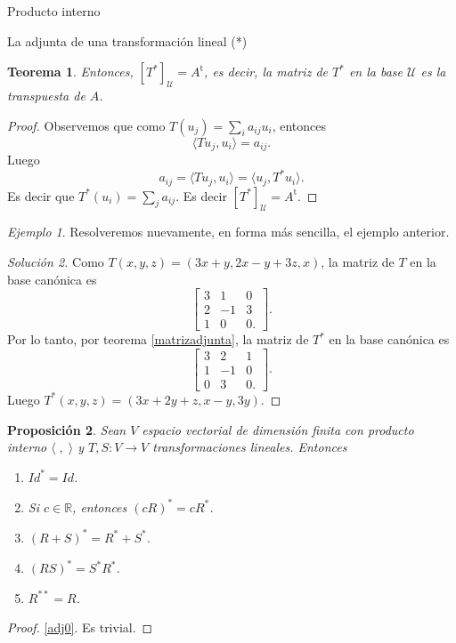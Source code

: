 \documentclass[a4paper,12pt,twoside,spanish,reqno]{amsbook}
\numberwithin{equation}{section}
\newtheorem{teorema}{Teorema}[section]
\newtheorem{proposicion}[teorema]{Proposici\'on}
\theoremstyle{definition}
\theoremstyle{remark}
\newtheorem*{ejemplo*}{Ejemplo}
\newcommand{\la}{\langle}
\newcommand{\ra}{\rangle}
\renewcommand{\t}{{\operatorname{t}}}
\newcommand{\R}{\mathbb R}
\begin{document}
\begin{chapter}{Producto interno}
\begin{section}{La adjunta de una transformación lineal (*)}
\begin{teorema}
            Entonces, $[T^*]_{\mathcal U} = A^\t$, es decir, la matriz de $T^*$ en la base $\mathcal U$ es la transpuesta de $A$. 
        \end{teorema}
        \begin{proof}
            Observemos  que como $T(u_j) = \sum_i a_{ij}u_i$, entonces 
            $$
            \la Tu_j,u_i\ra = a_{ij}.
            $$
            Luego 
            $$
            a_{ij} = \la Tu_j,u_i\ra = \la u_j,T^*u_i\ra.
            $$
            Es decir  que $T^*(u_i) = \sum_j a_{ij}$. Es decir $[T^*]_{\mathcal U} = A^\t$.
        \end{proof}
        
        
    
        
        \begin{ejemplo*} Resolveremos nuevamente, en forma más sencilla, el ejemplo anterior.
        \end{ejemplo*}
        \begin{proof}[Solución 2]
            Como $T(x,y,z) = (3x +y, 2x -y+ 3z, x)$, la matriz de $T$ en la base canónica es 
            $$
            \left[\begin{matrix}
            3&1&0\\2&-1&3\\1&0&0.
            \end{matrix}
            \right].
            $$
            Por lo tanto, por teorema  \ref{matrizadjunta}, la matriz de $T^*$ en la base canónica es
            $$
            \left[\begin{matrix}
            3&2&1\\1&-1&0\\0&3&0.
            \end{matrix}
            \right].
            $$
            Luego $T^*(x,y,z) = (3x+2y+z,x-y,3y)$.
        \end{proof}

    
        
        \begin{proposicion}\label{adjprop}
            Sean $V$ espacio vectorial de dimensión finita con producto interno $\la \;,\;\ra$ y $T,S:V \to V$ transformaciones lineales. Entonces
            \begin{enumerate}
                \item\label{adj0} $Id^* = Id$.
                \item\label{adj1} Si $c \in \R$, entonces $(cR)^* = cR^*$.
                \item\label{adj2} $(R+S)^* = R^* + S^*$.
                \item\label{adj3} $(RS)^* = S^*R^*$.
                \item\label{adj4} $R^{**} = R$.
            \end{enumerate} 
        \end{proposicion}
        \begin{proof}
            \ref{adj0}. Es trivial.
            

\end{proof}
\end{section}
\end{chapter}
\end{document}
